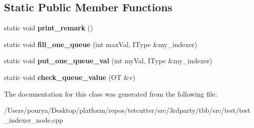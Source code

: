 \subsection*{Static Public Member Functions}
\begin{DoxyCompactItemize}
\item 
\hypertarget{classserial__queue__helper_3_011_00_01IType_01_4_a9d0e097a2bae772f3af8c3858b86b16b}{}static void {\bfseries print\+\_\+remark} ()\label{classserial__queue__helper_3_011_00_01IType_01_4_a9d0e097a2bae772f3af8c3858b86b16b}

\item 
\hypertarget{classserial__queue__helper_3_011_00_01IType_01_4_abc615453dfb25a39cccdba8ea7dd016e}{}static void {\bfseries fill\+\_\+one\+\_\+queue} (int max\+Val, I\+Type \&my\+\_\+indexer)\label{classserial__queue__helper_3_011_00_01IType_01_4_abc615453dfb25a39cccdba8ea7dd016e}

\item 
\hypertarget{classserial__queue__helper_3_011_00_01IType_01_4_aee8a7e93965b87218cf60fe3aa0c0dea}{}static void {\bfseries put\+\_\+one\+\_\+queue\+\_\+val} (int my\+Val, I\+Type \&my\+\_\+indexer)\label{classserial__queue__helper_3_011_00_01IType_01_4_aee8a7e93965b87218cf60fe3aa0c0dea}

\item 
\hypertarget{classserial__queue__helper_3_011_00_01IType_01_4_aff5987b3ffcc8a2338443c305187d4a5}{}static void {\bfseries check\+\_\+queue\+\_\+value} (O\+T \&v)\label{classserial__queue__helper_3_011_00_01IType_01_4_aff5987b3ffcc8a2338443c305187d4a5}

\end{DoxyCompactItemize}


The documentation for this class was generated from the following file\+:\begin{DoxyCompactItemize}
\item 
/\+Users/pourya/\+Desktop/platform/repos/tetcutter/src/3rdparty/tbb/src/test/test\+\_\+indexer\+\_\+node.\+cpp\end{DoxyCompactItemize}
